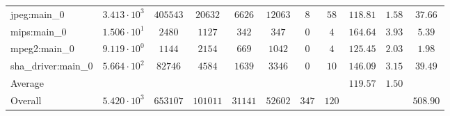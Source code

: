 \begin{tabular}{|l|c|c|c|c|c|c|c|c|c|c|}
jpeg:main\_0            & $ 3.413 \cdot 10^{3}  $ & $ 405543 $ & $ 20632  $ & $ 6626  $ & $ 12063 $ & $ 8   $ & $ 58  $ & $ 118.81      $ & $ 1.58    $ & $ 37.66   $ \\
mips:main\_0            & $ 1.506 \cdot 10^{1}  $ & $ 2480   $ & $ 1127   $ & $ 342   $ & $ 347   $ & $ 0   $ & $ 4   $ & $ 164.64      $ & $ 3.93    $ & $ 5.39    $ \\
mpeg2:main\_0           & $ 9.119 \cdot 10^{0}  $ & $ 1144   $ & $ 2154   $ & $ 669   $ & $ 1042  $ & $ 0   $ & $ 4   $ & $ 125.45      $ & $ 2.03    $ & $ 1.98    $ \\
sha\_driver:main\_0     & $ 5.664 \cdot 10^{2}  $ & $ 82746  $ & $ 4584   $ & $ 1639  $ & $ 3346  $ & $ 0   $ & $ 10  $ & $ 146.09      $ & $ 3.15    $ & $ 39.49   $ \\
\hline
Average                 & $                     $ & $        $ & $        $ & $       $ & $       $ & $     $ & $     $ & $ 119.57      $ & $ 1.50    $ & $         $ \\
\hline
Overall                 & $ 5.420 \cdot 10^{3}  $ & $ 653107 $ & $ 101011 $ & $ 31141 $ & $ 52602 $ & $ 347 $ & $ 120 $ & $             $ & $         $ & $ 508.90  $ \\
\hline
\end{tabular}

